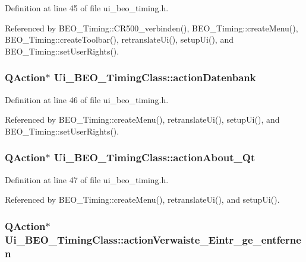 Definition at line 45 of file ui\_\-beo\_\-timing.h.

Referenced by BEO\_\-Timing::CR500\_\-verbinden(), BEO\_\-Timing::createMenu(), BEO\_\-Timing::createToolbar(), retranslateUi(), setupUi(), and BEO\_\-Timing::setUserRights().\hypertarget{class_ui___b_e_o___timing_class_d4f5ee280c8e806064dc61da9aeb8a07}{
\subsubsection[actionDatenbank]{\setlength{\rightskip}{0pt plus 5cm}QAction$\ast$ {\bf Ui\_\-BEO\_\-TimingClass::actionDatenbank}}}
\label{class_ui___b_e_o___timing_class_d4f5ee280c8e806064dc61da9aeb8a07}




Definition at line 46 of file ui\_\-beo\_\-timing.h.

Referenced by BEO\_\-Timing::createMenu(), retranslateUi(), setupUi(), and BEO\_\-Timing::setUserRights().\hypertarget{class_ui___b_e_o___timing_class_d8ad45cd3a3828ddcec7600e63e8d845}{
\subsubsection[actionAbout\_\-Qt]{\setlength{\rightskip}{0pt plus 5cm}QAction$\ast$ {\bf Ui\_\-BEO\_\-TimingClass::actionAbout\_\-Qt}}}
\label{class_ui___b_e_o___timing_class_d8ad45cd3a3828ddcec7600e63e8d845}




Definition at line 47 of file ui\_\-beo\_\-timing.h.

Referenced by BEO\_\-Timing::createMenu(), retranslateUi(), and setupUi().\hypertarget{class_ui___b_e_o___timing_class_9dfca8038e5806d6a7bb1f004fe3c96f}{
\subsubsection[actionVerwaiste\_\-Eintr\_\-ge\_\-entfernen]{\setlength{\rightskip}{0pt plus 5cm}QAction$\ast$ {\bf Ui\_\-BEO\_\-TimingClass::actionVerwaiste\_\-Eintr\_\-ge\_\-entfernen}}}
\label{class_ui___b_e_o___timing_class_9dfca8038e5806d6a7bb1f004fe3c96f}




